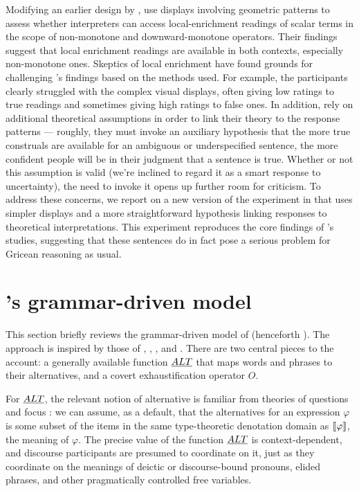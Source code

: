 \documentclass[leqno]{article}
\begin{document}
Modifying an earlier design by \citet{Geurts:Pouscoulous:2009},
\citeauthor{Chemla:Spector:2011} use displays involving geometric
patterns to assess whether interpreters can access local-enrichment
readings of scalar terms in the scope of non-monotone and
downward-monotone operators. Their findings suggest that local
enrichment readings are available in both contexts, especially
non-monotone ones. Skeptics of local enrichment have found grounds for
challenging \citeauthor{Chemla:Spector:2011}'s findings based on the
methods used. For example, the participants clearly struggled with the
complex visual displays, often giving low ratings to true readings and
sometimes giving high ratings to false ones. In addition,
\citeauthor{Chemla:Spector:2011} rely on additional theoretical
assumptions in order to link their theory to the response patterns ---
roughly, they must invoke an auxiliary hypothesis that the more true
construals are available for an ambiguous or underspecified sentence,
the more confident people will be in their judgment that a sentence is
true. Whether or not this assumption is valid (we're inclined to
regard it as a smart response to uncertainty), the need to invoke it
opens up further room for criticism. To address these concerns, we
report on a new version of the experiment in  that
uses simpler displays and a more straightforward hypothesis linking
responses to theoretical interpretations. This experiment reproduces
the core findings of \citeauthor{Chemla:Spector:2011}'s studies,
suggesting that these sentences do in fact pose a serious problem for
Gricean reasoning as usual.


\section{\CFS's grammar-driven model}\label{sec:cfs}

This section briefly reviews the grammar-driven model of
\citet{ChierchiaFoxSpector08} (henceforth \CFS).  The approach is
inspired by those of \citet{Chierchia01}, \citet{Sauerland01},
\citet{Spector:2007}, and \citet{Fox:2007,Fox:2009}. There are two
central pieces to the account: a generally available function $\emph{ALT}$
that maps words and phrases to their alternatives, and a covert
exhaustification operator $O$.

For $\emph{ALT}$, the relevant notion of alternative is familiar from
theories of questions and focus \citep{Groenendijk84,Rooth85,Rooth92}:
we can assume, as a default, that the alternatives for an expression
$\varphi$ is some subset of the items in the same type-theoretic
denotation domain as $\llbracket\varphi\rrbracket$, the meaning of $\varphi$. 
The precise value of the function $\emph{ALT}$ is context-dependent, and
discourse participants are presumed to coordinate on it, just as they
coordinate on the meanings of deictic or discourse-bound pronouns,
elided phrases, and other pragmatically controlled free variables.
\end{document}
